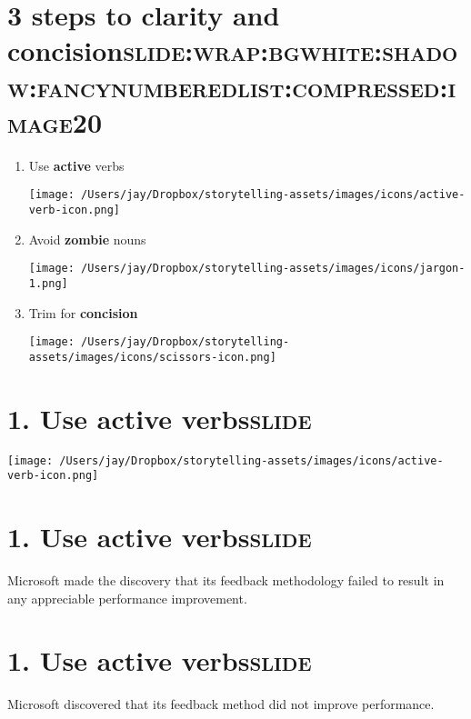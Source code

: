 \documentclass[12pt]{article}
\begin{document}
\section[3 steps to \textbf{clarity} and \textbf{concision}]{3 steps to \textbf{clarity} and \textbf{concision}\hfill{}\textsc{slide:wrap:bgwhite:shadow:fancynumberedlist:compressed:image20}}
\label{sec:org68eca39}
\begin{enumerate}
\item Use \textbf{active} verbs \begin{center}
\texttt{[image: /Users/jay/Dropbox/storytelling-assets/images/icons/active-verb-icon.png]}
\end{center}
\item Avoid \textbf{zombie} nouns \begin{center}
\texttt{[image: /Users/jay/Dropbox/storytelling-assets/images/icons/jargon-1.png]}
\end{center}
\item Trim for \textbf{concision} \begin{center}
\texttt{[image: /Users/jay/Dropbox/storytelling-assets/images/icons/scissors-icon.png]}
\end{center}
\end{enumerate}

\section[1. Use \textbf{active} verbs]{1. Use \textbf{active} verbs\hfill{}\textsc{slide}}
\label{sec:org59e0226}
\begin{center}
\texttt{[image: /Users/jay/Dropbox/storytelling-assets/images/icons/active-verb-icon.png]}
\end{center}

\section[1. Use \textbf{active} verbs]{1. Use \textbf{active} verbs\hfill{}\textsc{slide}}
\label{sec:org7d00935}
Microsoft made the discovery that its feedback methodology failed to result in any appreciable performance improvement.

\section[1. Use \textbf{active} verbs]{1. Use \textbf{active} verbs\hfill{}\textsc{slide}}
\label{sec:orgcc10a34}
Microsoft discovered that its feedback method did not improve performance.
\end{document}
